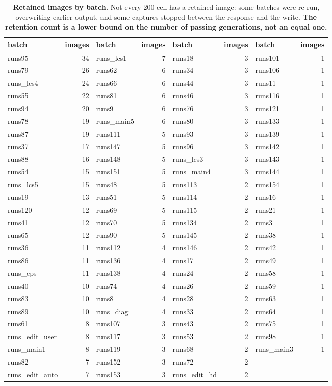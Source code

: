 \begin{table}[t]\centering\footnotesize
\setlength{\tabcolsep}{3.5pt}
\begin{tabular}{@{}lrlrlrlr@{}}\toprule
batch & images & batch & images & batch & images & batch & images \\
\midrule
runs95 & 34 & runs\_lcs1 & 7 & runs18 & 3 & runs101 & 1\\
runs79 & 26 & runs62 & 6 & runs34 & 3 & runs106 & 1\\
runs\_lcs4 & 24 & runs66 & 6 & runs44 & 3 & runs11 & 1\\
runs55 & 22 & runs81 & 6 & runs46 & 3 & runs116 & 1\\
runs94 & 20 & runs9 & 6 & runs76 & 3 & runs121 & 1\\
runs78 & 19 & runs\_main5 & 6 & runs80 & 3 & runs133 & 1\\
runs87 & 19 & runs111 & 5 & runs93 & 3 & runs139 & 1\\
runs37 & 17 & runs147 & 5 & runs96 & 3 & runs142 & 1\\
runs88 & 16 & runs148 & 5 & runs\_lcs3 & 3 & runs143 & 1\\
runs54 & 15 & runs151 & 5 & runs\_main4 & 3 & runs144 & 1\\
runs\_lcs5 & 15 & runs48 & 5 & runs113 & 2 & runs154 & 1\\
runs19 & 13 & runs51 & 5 & runs114 & 2 & runs16 & 1\\
runs120 & 12 & runs69 & 5 & runs115 & 2 & runs21 & 1\\
runs41 & 12 & runs70 & 5 & runs134 & 2 & runs3 & 1\\
runs65 & 12 & runs90 & 5 & runs145 & 2 & runs38 & 1\\
runs36 & 11 & runs112 & 4 & runs146 & 2 & runs42 & 1\\
runs86 & 11 & runs136 & 4 & runs17 & 2 & runs49 & 1\\
runs\_eps & 11 & runs138 & 4 & runs24 & 2 & runs58 & 1\\
runs40 & 10 & runs74 & 4 & runs26 & 2 & runs59 & 1\\
runs83 & 10 & runs8 & 4 & runs28 & 2 & runs63 & 1\\
runs89 & 10 & runs\_diag & 4 & runs33 & 2 & runs64 & 1\\
runs61 & 8 & runs107 & 3 & runs43 & 2 & runs75 & 1\\
runs\_edit\_user & 8 & runs117 & 3 & runs53 & 2 & runs98 & 1\\
runs\_main1 & 8 & runs119 & 3 & runs68 & 2 & runs\_main3 & 1\\
runs82 & 7 & runs152 & 3 & runs72 & 2 &  & \\
runs\_edit\_auto & 7 & runs153 & 3 & runs\_edit\_hd & 2 &  & \\
\bottomrule\end{tabular}
\caption{\textbf{Retained images by batch.} Not every 200 cell has a retained image: some batches were re-run, overwriting earlier output, and some captures stopped between the response and the write. \textbf{The retention count is a lower bound on the number of passing generations, not an equal one.}}
\label{tab:appimages}\end{table}
